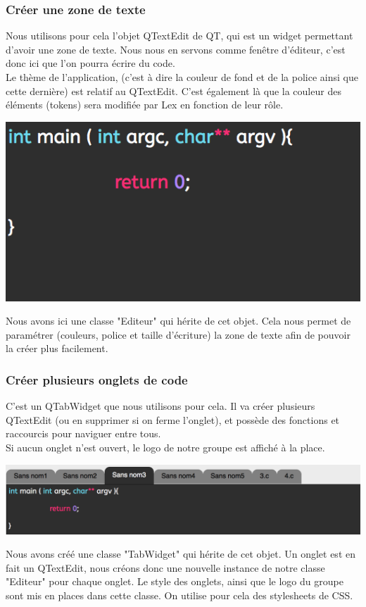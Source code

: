 \documentclass[a4paper,12pt]{article}
\begin{document}
			\subsubsection*{Créer une zone de texte}
			 Nous utilisons pour cela l'objet QTextEdit de QT, qui est un widget permettant d'avoir une zone de texte. Nous nous en servons comme fenêtre d'éditeur, c'est donc ici que l'on pourra écrire du code.\\
			Le thème de l'application, (c'est à dire la couleur de fond et de la police ainsi que cette dernière) est relatif au QTextEdit. C'est également là que la couleur des éléments (tokens) sera modifiée par Lex en fonction de leur rôle.\\
			\begin{center}
				\includegraphics[scale=1]{images/QTextEdit}
				\vspace{0.5cm}
			\end{center}
			Nous avons ici une classe "Editeur" qui hérite de cet objet. Cela nous permet de paramétrer (couleurs, police et taille d'écriture) la zone de texte afin de pouvoir la créer plus facilement.\\
			
			
			\subsubsection*{Créer plusieurs onglets de code}
			 C'est un QTabWidget que nous utilisons pour cela. Il va créer plusieurs QTextEdit (ou en supprimer si on ferme l'onglet), et possède des fonctions et raccourcis pour naviguer entre tous. \\
			Si aucun onglet n'est ouvert, le logo de notre groupe est affiché à la place.\\
			\begin{center}
				\includegraphics[scale=0.6]{images/QTabWidget}
				\vspace{0.5cm}
			\end{center}
			Nous avons créé une classe "TabWidget" qui hérite de cet objet. Un onglet est en fait un QTextEdit, nous créons donc une nouvelle instance de notre classe "Editeur" pour chaque onglet. Le style des onglets, ainsi que le logo du groupe sont mis en places dans cette classe. On utilise pour cela des stylesheets de CSS.\\
			
\end{document}

